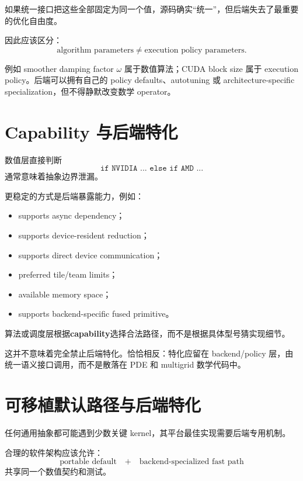 如果统一接口把这些全部固定为同一个值，源码确实“统一”，但后端失去了最重要的优化自由度。

因此应该区分：
\begin{equation}
\boxed{
\text{algorithm parameters}
\neq
\text{execution policy parameters}.
}
\end{equation}

例如 smoother damping factor $\omega$ 属于数值算法；CUDA block size 属于 execution policy。后端可以拥有自己的 policy defaults、autotuning 或 architecture-specific specialization，但不得静默改变数学 operator。

\section{Capability 与后端特化}

数值层直接判断
\begin{equation}
\texttt{if NVIDIA ... else if AMD ...}
\end{equation}
通常意味着抽象边界泄漏。

更稳定的方式是后端暴露能力，例如：
\begin{itemize}
\item supports async dependency；
\item supports device-resident reduction；
\item supports direct device communication；
\item preferred tile/team limits；
\item available memory space；
\item supports backend-specific fused primitive。
\end{itemize}

算法或调度层根据\textbf{capability}选择合法路径，而不是根据具体型号猜实现细节。

这并不意味着完全禁止后端特化。恰恰相反：特化应留在 backend/policy 层，由统一语义接口调用，而不是散落在 PDE 和 multigrid 数学代码中。

\section{可移植默认路径与后端特化}

任何通用抽象都可能遇到少数关键 kernel，其平台最佳实现需要后端专用机制。

合理的软件架构应该允许：
\begin{equation}
\boxed{
\text{portable default}
\quad+\quad
\text{backend-specialized fast path}
}
\end{equation}
共享同一个数值契约和测试。


